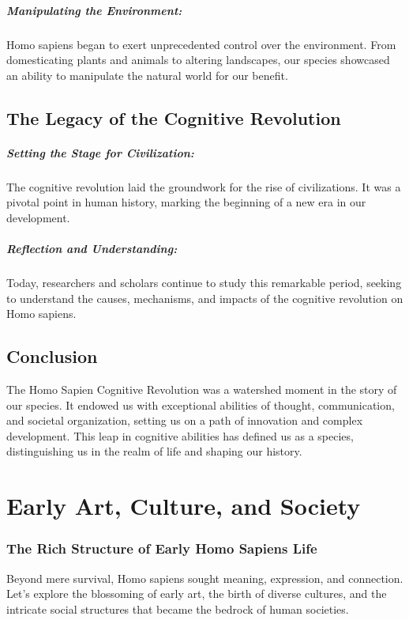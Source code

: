 \documentclass{book}
\begin{document}
\paragraph{Manipulating the Environment:}
Homo sapiens began to exert unprecedented control over the environment. From domesticating plants and animals to altering landscapes, our species showcased an ability to manipulate the natural world for our benefit.

\section*{The Legacy of the Cognitive Revolution}

\paragraph{Setting the Stage for Civilization:}
The cognitive revolution laid the groundwork for the rise of civilizations. It was a pivotal point in human history, marking the beginning of a new era in our development.

\paragraph{Reflection and Understanding:}
Today, researchers and scholars continue to study this remarkable period, seeking to understand the causes, mechanisms, and impacts of the cognitive revolution on Homo sapiens.

\section*{Conclusion}

The Homo Sapien Cognitive Revolution was a watershed moment in the story of our species. It endowed us with exceptional abilities of thought, communication, and societal organization, setting us on a path of innovation and complex development. This leap in cognitive abilities has defined us as a species, distinguishing us in the realm of life and shaping our history.

\chapter{Early Art, Culture, and Society}
\subsection*{The Rich Structure of Early Homo Sapiens Life}
Beyond mere survival, Homo sapiens sought meaning, expression, and connection. Let's explore the blossoming of early art, the birth of diverse cultures, and the intricate social structures that became the bedrock of human societies.
\end{document}
